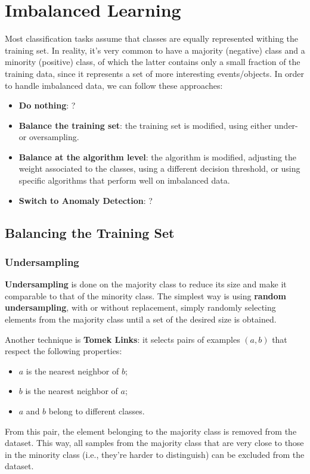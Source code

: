 \chapter{Imbalanced Learning}

Most classification tasks assume that classes are equally represented withing the training set. In reality, it's very common to have a majority (negative) class and a minority (positive) class, of which the latter contains only a small fraction of the training data, since it represents a set of more interesting events/objects. In order to handle imbalanced data, we can follow these approaches:
\begin{itemize}
    \item \textbf{Do nothing}: ?
    \item \textbf{Balance the training set}: the training set is modified, using either under- or oversampling.
    \item \textbf{Balance at the algorithm level}: the algorithm is modified, adjusting the weight associated to the classes, using a different decision threshold, or using specific algorithms that perform well on imbalanced data.
    \item \textbf{Switch to Anomaly Detection}: ?
\end{itemize}

\section{Balancing the Training Set}

\subsection{Undersampling}

\textbf{Undersampling} is done on the majority class to reduce its size and make it comparable to that of the minority class. The simplest way is using \textbf{random undersampling}, with or without replacement, simply randomly selecting elements from the majority class until a set of the desired size is obtained.

Another technique is \textbf{Tomek Links}: it selects pairs of examples $(a,b)$ that respect the following properties:
\begin{itemize}
    \item $a$ is the nearest neighbor of $b$;
    \item $b$ is the nearest neighbor of $a$;
    \item $a$ and $b$ belong to different classes.
\end{itemize}
From this pair, the element belonging to the majority class is removed from the dataset. This way, all samples from the majority class that are very close to those in the minority class (i.e., they're harder to distinguish) can be excluded from the dataset.

